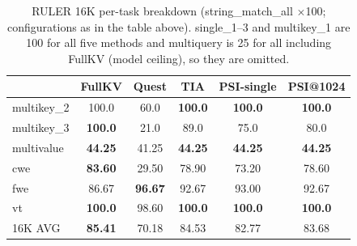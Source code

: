 \documentclass[11pt]{article}
\begin{document}
\begin{table}[h]\centering
\small\setlength{\tabcolsep}{4pt}
\caption{RULER 16K per-task breakdown (string\_match\_all $\times$100; configurations as in the table above). single\_1--3 and multikey\_1 are 100 for all five methods and multiquery is 25 for all including FullKV (model ceiling), so they are omitted.}
\label{tab:ruler16k}
\begin{tabular}{lccccc}
\toprule
 & FullKV & Quest & TIA & PSI-single & PSI@1024 \\
\midrule
multikey\_2 & 100.0 & 60.0 & \textbf{100.0} & \textbf{100.0} & \textbf{100.0} \\
multikey\_3 & \textbf{100.0} & 21.0 & 89.0 & 75.0 & 80.0 \\
multivalue & \textbf{44.25} & 41.25 & \textbf{44.25} & \textbf{44.25} & \textbf{44.25} \\
cwe & \textbf{83.60} & 29.50 & 78.90 & 73.20 & 78.60 \\
fwe & 86.67 & \textbf{96.67} & 92.67 & 93.00 & 92.67 \\
vt & \textbf{100.0} & 98.60 & \textbf{100.0} & \textbf{100.0} & \textbf{100.0} \\
16K AVG & \textbf{85.41} & 70.18 & 84.53 & 82.77 & 83.68 \\
\bottomrule
\end{tabular}
\end{table}
\end{document}
